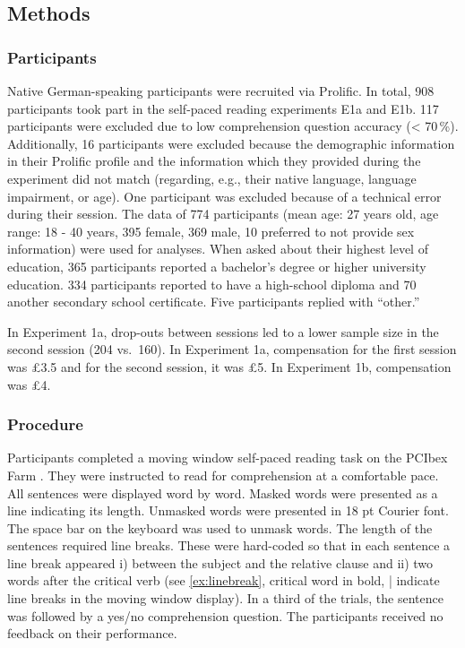 \documentclass[a4paper, man, floatsintext]{apa7}
\begin{document}
\subsection{Methods}
\subsubsection{Participants}

Native German-speaking participants were recruited via Prolific. In total, 908 participants took part in the self-paced reading experiments E1a and E1b. 117 participants were excluded due to low comprehension question accuracy (< 70\,\%). Additionally, 16 participants were excluded because the demographic information in their Prolific profile and the information which they provided during the experiment did not match (regarding, e.g., their native language, language impairment, or age). One participant was excluded because of a technical error during their session. The data of 774 participants (mean age: 27 years old, age range: 18 - 40 years, 395 female, 369 male, 10 preferred to not provide sex information) were used for analyses. When asked about their highest level of education, 365 participants reported a bachelor's degree or higher university education. 334 participants reported to have a high-school diploma and 70 another secondary school certificate. Five participants replied with ``other.'' 

In Experiment 1a, drop-outs between sessions led to a lower sample size in the second session (204 vs.\ 160). In Experiment 1a, compensation for the first session was \pounds 3.5 and for the second session, it was \pounds 5. In Experiment 1b, compensation was \pounds 4. 

\subsubsection{Procedure}
Participants completed a moving window self-paced reading task \citep{just_etal_1982} on the PCIbex Farm \citep{pcibex}. They were instructed to read for comprehension at a comfortable pace. All sentences were displayed word by word. Masked words were presented as a line indicating its length. Unmasked words were presented in 18 pt Courier font. The space bar on the keyboard was used to unmask words. The length of the sentences required line breaks. These were hard-coded so that in each sentence a line break appeared i) between the subject and the relative clause and ii) two words after the critical verb (see \ref{ex:linebreak}, critical word in bold, | indicate line breaks in the moving window display). In a third of the trials, the sentence was followed by a yes/no comprehension question. The participants received no feedback on their performance.
\end{document}
